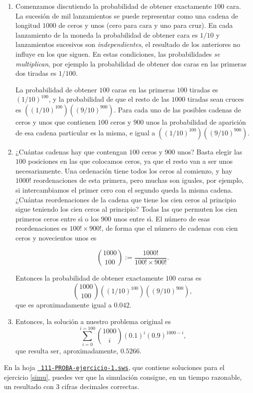 \begin{enumerate}
\item Comenzamos discutiendo la probabilidad de obtener exactamente $100$ cara.
La sucesión de mil lanzamientos se puede representar
como una cadena de longitud $1000$ de ceros y unos (cero para cara y uno para
cruz). En cada lanzamiento de la moneda la probabilidad de obtener cara es
$1/10$ y lanzamientos sucesivos son {\itshape independientes}, el resultado de
los anteriores  no influye en los que siguen. En estas condiciones, las
probabilidades {\itshape se multiplican}, por ejemplo la probabilidad de obtener
dos caras en las primeras dos tiradas es $1/100$.

La probabilidad de obtener $100$ caras en las primeras $100$ tiradas es
$(1/10)^{100}$, y la probabilidad de que el resto de las $1000$ tiradas sean
cruces es $((1/10)^{100})((9/10)^{900})$. Para cada uno de las posibles cadenas
de ceros y unos que contienen $100$ ceros y $900$ unos la probabilidad de
aparici\'on de esa cadena particular es la misma, e igual a
$((1/10)^{100})((9/10)^{900})$.

\item ¿Cuántas cadenas hay que contengan $100$ ceros y $900$ unos? Basta elegir
las $100$ posiciones en las que colocamos ceros, ya que el resto van a ser unos
necesariamente. Una ordenaci\'on tiene todos los ceros al comienzo, y hay
$1000!$ reordenaciones de esta primera, pero muchas son iguales, por ejemplo, si
intercambiamos el primer cero con el segundo queda la misma cadena. ¿Cu\'antas
reordenaciones de la cadena que tiene los cien ceros al principio sigue teniendo
los cien ceros al principio? Todas las que permuten los cien primeros ceros
entre s\'{\i} o los 900 unos entre s\'{\i}. El n\'umero de esas reordenaciones
es $100!\times 900!$, de forma que el n\'umero de cadenas con cien ceros y
novecientos unos es

\[\binom{1000}{100}:=\frac{1000!}{100!\times 900!}.\]

Entonces la probabilidad de obtener exactamente $100$ caras es
\[\binom{1000}{100}((1/10)^{100})((9/10)^{900}),\]
\noindent que es aproximadamente igual a $0{.}042.$

\item Entonces, la soluci\'on a nuestro problema original es 
\[\sum_{i=0}^{i=100}\binom{1000}{i} (0{.}1)^i(0{.}9)^{1000-i},\]
\noindent que resulta ser, aproximadamente, $0{.}5266.$
\end{enumerate}
En la hoja \href{http://sage.mat.uam.es:8888/home/pub/?/}{\tt
111-PROBA-ejercicio-1.sws},
que contiene soluciones para el ejercicio \ref{simu}, 
puedes ver que la simulaci\'on consigue, en un tiempo razonable,  un resultado
con $3$ cifras decimales correctas.


